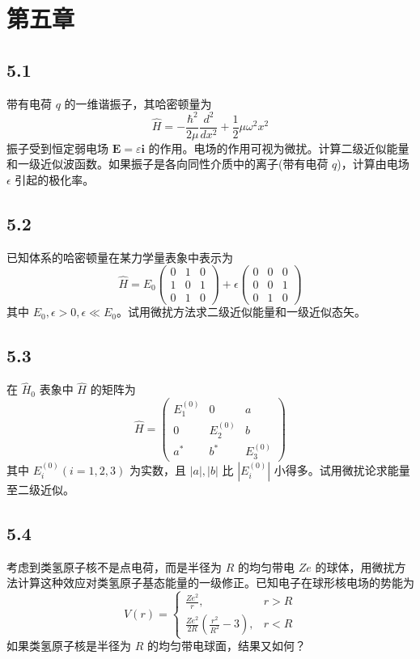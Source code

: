 \section{第五章}

\subsection{5.1}
带有电荷 $q$ 的一维谐振子，其哈密顿量为
$$\hat{H} = -\frac{\hbar^{2}}{2\mu} \frac{d^{2}}{dx^{2}} + \frac{1}{2} \mu \omega^{2} x^{2}$$
振子受到恒定弱电场 $\boldsymbol{E}=\varepsilon \boldsymbol{i}$ 的作用。电场的作用可视为微扰。计算二级近似能量和一级近似波函数。如果振子是各向同性介质中的离子(带有电荷 $q$)，计算由电场 $\epsilon$ 引起的极化率。

\subsection{5.2}
已知体系的哈密顿量在某力学量表象中表示为
$$\hat{H} = E_0 \begin{pmatrix} 0 & 1 & 0 \\ 1 & 0 & 1 \\ 0 & 1 & 0 \end{pmatrix} + \epsilon \begin{pmatrix} 0 & 0 & 0 \\ 0 & 0 & 1 \\ 0 & 1 & 0 \end{pmatrix}$$
其中 $E_0, \epsilon > 0, \epsilon \ll E_0$。试用微扰方法求二级近似能量和一级近似态矢。

\subsection{5.3}
在 $\hat{H}_0$ 表象中 $\hat{H}$ 的矩阵为
$$\hat{H} = \begin{pmatrix} E_1^{(0)} & 0 & a \\ 0 & E_2^{(0)} & b \\ a^* & b^* & E_3^{(0)} \end{pmatrix}$$
其中 $E_i^{(0)}(i=1,2,3)$ 为实数，且 $|a|, |b|$ 比 $|E_i^{(0)}|$ 小得多。试用微扰论求能量至二级近似。

\subsection{5.4}
考虑到类氢原子核不是点电荷，而是半径为 $R$ 的均匀带电 $Ze$ 的球体，用微扰方法计算这种效应对类氢原子基态能量的一级修正。已知电子在球形核电场的势能为
$$V(r) = \begin{cases} \frac{Ze^2}{r}, & r > R \\ \frac{Ze^2}{2R} \left( \frac{r^2}{R^2} - 3 \right), & r < R \end{cases}$$
如果类氢原子核是半径为 $R$ 的均匀带电球面，结果又如何？

